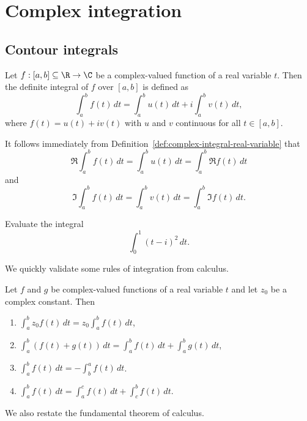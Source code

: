 \chapter{Complex integration}

\section{Contour integrals}

\begin{definition}
    Let \(f: [a, b] \subseteq \R \to \C\) be a complex-valued function of a real variable \(t\). Then the definite integral of \(f\) over \([a, b]\) is defined as
    \[
        \int_a^b f(t) \, dt = \int_a^b u(t) \, dt + i \int_a^b v(t) \, dt,
    \]
    where \(f(t) = u(t) + iv(t)\) with \(u\) and \(v\) continuous for all \(t \in [a, b]\).
    \label{def:complex-integral-real-variable}
\end{definition}

It follows immediately from Definition~\ref{def:complex-integral-real-variable} that
\[
    \Re \int_a^b f(t) \, dt = \int_a^b u(t) \, dt = \int_a^b \Re f(t) \, dt
\]
and
\[
    \Im \int_a^b f(t) \, dt = \int_a^b v(t) \, dt = \int_a^b \Im f(t) \, dt.
\]

\begin{example}
    Evaluate the integral
    \[
        \int_0^1 (t-i)^2 \, dt.
    \]
\end{example}

We quickly validate some rules of integration from calculus.

\begin{theorem}
    Let \(f\) and \(g\) be complex-valued functions of a real variable \(t\) and let \(z_0\) be a complex constant. Then
    \begin{enumerate}[label=(\alph*)]
        \item \(\displaystyle \int_a^b z_0 f(t) \, dt = z_0 \int_a^b f(t) \, dt\),
        \item \(\displaystyle \int_a^b \left( f(t) + g(t) \right) \, dt = \int_a^b f(t) \, dt + \int_a^b g(t) \, dt\),
        \item \(\displaystyle \int_a^b f(t) \, dt = -\int_b^a f(t) \, dt\).
        \item \(\displaystyle \int_a^b f(t) \, dt = \int_a^c f(t) \, dt + \int_c^b f(t) \, dt\).
    \end{enumerate}
\end{theorem}

We also restate the fundamental theorem of calculus.

